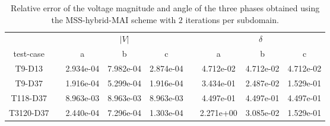 \begin{table}
\renewcommand{\arraystretch}{1.3}
\centering
\label{}\hspace{2cm}\caption{Relative error of the voltage magnitude and angle of the three phases obtained using the MSS-hybrid-MAI scheme with $2$ iterations per subdomain. }
\begin{adjustbox}{width=1\textwidth} %
\small
\begin{tabular}{ccccccccc}
\toprule
{} && \multicolumn{3}{c}{$|V|$} && \multicolumn{3}{c}{$\delta$}  \\
\cmidrule{3-5}\cmidrule{7-9}
 test-case &&        a &        b &       c &&        a &       b &        c \\
\midrule
T9-D13       &&  2.934e-04 &  7.982e-04 &  2.874e-04 &&  4.712e-02 &  4.712e-02 &  4.712e-02 \\
T9-D37       &&  1.916e-04 &  5.299e-04 &  1.916e-04 &&  3.434e-01 &  2.487e-02 &  1.529e-01 \\
T118-D37     &&  8.963e-03 &  8.963e-03 &  8.963e-03 &&  4.497e-01 &  4.497e-01 &  4.497e-01 \\
T3120-D37    &&  2.440e-04 &  7.296e-04 &  1.303e-04 &&  2.271e+00 &  3.085e-02 &  1.529e-01 \\
\bottomrule
\end{tabular}
\end{adjustbox}
\end{table}
